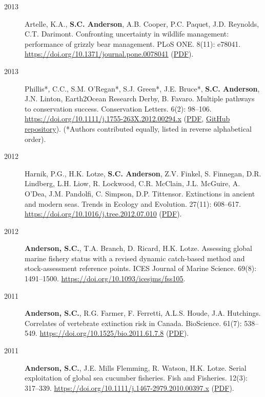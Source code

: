 \begin{description}
\item[2013]
Artelle, K.A., \textbf{S.C. Anderson}, A.B. Cooper, P.C. Paquet, J.D.
Reynolds, C.T. Darimont. Confronting uncertainty in wildlife management:
performance of grizzly bear management. PLoS ONE. 8(11): e78041.
\url{https://doi.org/10.1371/journal.pone.0078041}
(\href{http://www.plosone.org/article/fetchObject.action?uri=info\%3Adoi\%2F10.1371\%2Fjournal.pone.0078041&representation=PDF}{PDF}).
\item[2013]
Phillis*, C.C., S.M. O'Regan*, S.J. Green*, J.E. Bruce*, \textbf{S.C.
Anderson}, J.N. Linton, Earth2Ocean Research Derby, B. Favaro. Multiple
pathways to conservation success. Conservation Letters. 6(2): 98--106.
\url{https://doi.org/10.1111/j.1755-263X.2012.00294.x}
(\href{https://www.dropbox.com/s/cxt848ng5x4hc4t/Phillis_etal_2012_Multiple_pathways_to_conservation_success.pdf?dl=1}{PDF},
\href{https://github.com/seananderson/conservation_pathways}{GitHub
repository}). (*Authors contributed equally, listed in reverse
alphabetical order).
\item[2012]
Harnik, P.G., H.K. Lotze, \textbf{S.C. Anderson}, Z.V. Finkel, S.
Finnegan, D.R. Lindberg, L.H. Liow, R. Lockwood, C.R. McClain, J.L.
McGuire, A. O'Dea, J.M. Pandolfi, C. Simpson, D.P. Tittensor.
Extinctions in ancient and modern seas. Trends in Ecology and Evolution.
27(11): 608--617. \url{https://doi.org/10.1016/j.tree.2012.07.010}
(\href{https://www.dropbox.com/s/rdn9685viqr37qy/Harnik_etal_2012_Extinctions_in_ancient_and_modern_seas.pdf?dl=1}{PDF}).
\item[2012]
\textbf{Anderson, S.C.}, T.A. Branch, D. Ricard, H.K. Lotze. Assessing
global marine fishery status with a revised dynamic catch-based method
and stock-assessment reference points. ICES Journal of Marine Science.
69(8): 1491--1500. \url{https://doi.org/10.1093/icesjms/fss105}.
\item[2011]
\textbf{Anderson, S.C.}, R.G. Farmer, F. Ferretti, A.L.S. Houde, J.A.
Hutchings. Correlates of vertebrate extinction risk in Canada.
BioScience. 61(7): 538--549.
\url{https://doi.org/10.1525/bio.2011.61.7.8}
(\href{https://www.dropbox.com/s/bt16dvi3idw3gdx/Anderson_etal_2011_BioScience_with_supplement.pdf?dl=1}{PDF}).
\item[2011]
\textbf{Anderson, S.C.}, J.E. Mills Flemming, R. Watson, H.K. Lotze.
Serial exploitation of global sea cucumber fisheries. Fish and
Fisheries. 12(3): 317--339.
\url{https://doi.org/10.1111/j.1467-2979.2010.00397.x}
(\href{https://www.dropbox.com/s/d8id4zxe9xv6jau/Anderson_etal_2011_seacucumbers_with_supplement.pdf?dl=1}{PDF}).

\end{description}
